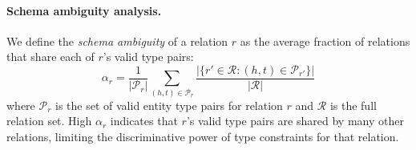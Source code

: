 
\paragraph{Schema ambiguity analysis.}
\label{app:kappa-analysis}

We define the \emph{schema ambiguity} of a relation $r$ as the average fraction of relations that share each of $r$'s valid type pairs:
\begin{equation}
\alpha_r = \frac{1}{|\mathcal{P}_r|} \sum_{(h,t) \in \mathcal{P}_r} \frac{|\{r' \in \mathcal{R} : (h,t) \in \mathcal{P}_{r'}\}|}{|\mathcal{R}|}
\label{eq:schema-ambiguity}
\end{equation}
where $\mathcal{P}_r$ is the set of valid entity type pairs for relation $r$ and $\mathcal{R}$ is the full relation set.
High $\alpha_r$ indicates that $r$'s valid type pairs are shared by many other relations, limiting the discriminative power of type constraints for that relation.

